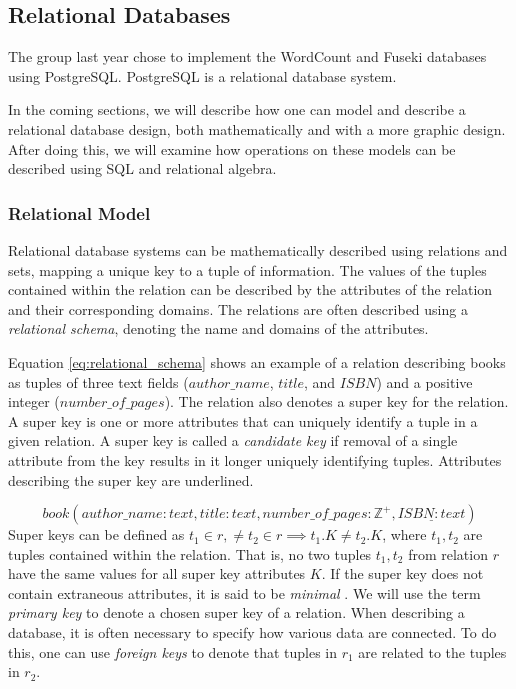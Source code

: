 \subsection{Relational Databases}\label{relational_databases}
The group last year chose to implement the WordCount and Fuseki databases using PostgreSQL.
PostgreSQL is a relational database system\cite{knox2020}.

In the coming sections, we will describe how one can model and describe a relational database design, both mathematically and with a more graphic design.
After doing this, we will examine how operations on these models can be described using SQL and relational algebra.

\subsubsection*{Relational Model}
Relational database systems can be mathematically described using relations and sets, mapping a unique key to a tuple of information\cite{DBSBook}.
The values of the tuples contained within the relation can be described by the attributes of the relation and their corresponding domains\cite{KatjaFirstPP}. 
The relations are often described using a \textit{relational schema}, denoting the name and domains of the attributes.


Equation \ref{eq:relational_schema} shows an example of a relation describing books as tuples of three text fields ($author\_name$, $title$, and $ISBN$) and a positive integer ($number\_of\_pages$).
The relation also denotes a super key for the relation. A super key is one or more attributes that can uniquely identify a tuple in a given relation.
A super key is called a \textit{candidate key} if removal of a single attribute from the key results in it longer uniquely identifying tuples.
Attributes describing the super key are underlined.

\begin{equation} \label{eq:relational_schema}
    book(author\_name:text, title: text, number\_of\_pages:\mathbb{Z}^+, \underline{ISBN: text})
\end{equation}
Super keys can be defined as $t_1 \in r,\neq t_2 \in r \implies t_1.K \neq t_2.K$, where $t_1, t_2$ are tuples contained within the relation.
That is, no two tuples $t_1, t_2$ from relation $r$ have the same values for all super key attributes $K$. 
If the super key does not contain extraneous attributes, it is said to be \textit{minimal} \cite{DBSBook}.
We will use the term \textit{primary key} to denote a chosen super key of a relation. 
When describing a database, it is often necessary to specify how various data are connected. 
To do this, one can use \textit{foreign keys} to denote that tuples in $r_1$ are related to the tuples in $r_2$.


